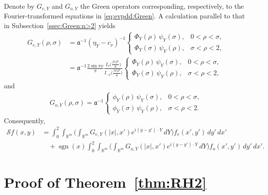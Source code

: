 \documentclass[12pt]{amsart}
\begin{document}
Denote by $G_{e,Y}$ and $G_{o,Y}$ the Green operators corresponding, respectively, to the Fourier-transformed equations in \eqref{eq:evpdd:Green}. A calculation parallel to that in Subsection~\ref{ssec:Green:n>2} yields
\begin{align}\label{eq_kernel_Green:n=1:even}
G_{e,Y}(\rho,\sigma) &= \mathfrak a^{-1} (\eta_Y - c_\nu)^{-1}
\begin{cases}
\Phi_{Y}(\rho) \, \psi_{Y}(\sigma), &0<\rho<\sigma,\\[4pt]
\Phi_{Y}(\sigma) \, \psi_{Y}(\rho), &\sigma < \rho < 2,
\end{cases}\nonumber\\
&=\mathfrak a^{-1} \frac{2\sin{\pi \nu}}{\pi} \frac{I_{\nu}\bigl( \frac{|Y| 2^{\mathfrak a}}{\mathfrak a} \bigr)}{I_{-\nu}\bigl( \frac{|Y| 2^{\mathfrak a}}{\mathfrak a} \bigr)}
\begin{cases}
\Phi_{Y}(\rho) \, \psi_{Y}(\sigma), &0<\rho<\sigma,\\[4pt]
\Phi_{Y}(\sigma) \, \psi_{Y}(\rho), &\sigma < \rho < 2,
\end{cases}
\end{align}
and
\begin{align}\label{eq_kernel_Green:n=1:odd}
G_{o,Y}(\rho,\sigma) = \mathfrak a^{-1}
\begin{cases}
\phi_{Y}(\rho) \, \psi_{Y}(\sigma), &0<\rho<\sigma,\\[4pt]
\phi_{Y}(\sigma) \, \psi_{Y}(\rho), &\sigma < \rho < 2.
\end{cases}
\end{align}
Consequently,
\begin{align}\label{eq:Green:n=1:full}
    \mathcal{S}f(x,y) &= \int_0^2 \int_{\mathbb{R}^m} \biggl( \int_{\mathbb{R}^m} G_{e,Y}(|x|,x') e^{i (y-y')\cdot Y} \, dY \biggr) f_e(x',y') \, dy' \, dx' \nonumber\\
    &\quad + \operatorname{sgn}(x) \int_0^2 \int_{\mathbb{R}^m} \biggl( \int_{\mathbb{R}^m} G_{o,Y}(|x|,x') e^{i (y-y')\cdot Y} \, dY \biggr) f_o(x',y') \, dy' \, dx'.
\end{align}













\section{Proof of Theorem~\ref{thm:RH2}}\label{sec:pf:n=1:alpha<1/2}
\end{document}
